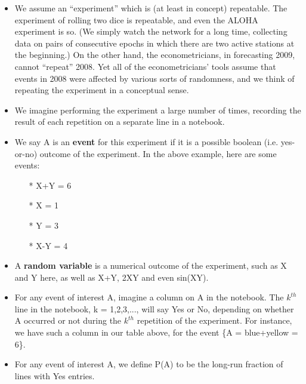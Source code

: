\begin{itemize}

\item We assume an ``experiment'' which is (at least in concept)
repeatable.  The experiment of rolling two dice is repeatable, and even
the ALOHA experiment is so.  (We simply watch the network for a long
time, collecting data on pairs of consecutive epochs in which there are
two active stations at the beginning.)  On the other hand, the
econometricians, in forecasting 2009, cannot ``repeat'' 2008.  Yet all
of the econometricians' tools assume that events in 2008 were affected
by various sorts of randomness, and we think of repeating the experiment
in a conceptual sense.

\item We imagine performing the experiment a large number of times,
recording the result of each repetition on a separate line in a
notebook.

\item We say A is an {\bf event} for this experiment if it is a possible
boolean (i.e. yes-or-no) outcome of the experiment.  In the above
example, here are some events:

\begin{itemize}

\item[*]  X+Y = 6

\item[*] X = 1

\item[*] Y = 3

\item[*] X-Y = 4

\end{itemize}

\item A {\bf random variable} is a numerical outcome of the experiment,
such as X and Y here, as well as X+Y, 2XY and even sin(XY).

\item For any event of interest A, imagine a column on A in the
notebook.  The $k^{th}$ line in the notebook, k = 1,2,3,..., will
say Yes or No, depending on whether A occurred or not during the
$k^{th}$ repetition of the experiment.  For instance, we have such a
column in our table above, for the event \{A = blue+yellow = 6\}.

\item For any event of interest A, we define P(A) to be the long-run
fraction of lines with Yes entries.


\end{itemize}
